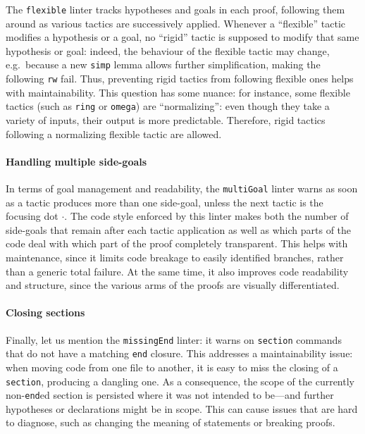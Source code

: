 \documentclass[runningheads]{llncs}
\newcommand{\lean}[1]{\texttt{#1}}
\newcommand{\hide}[1]{}
\begin{document}
The \lean{flexible} linter tracks hypotheses and goals in each proof, following them around as various tactics are successively applied.
Whenever a ``flexible'' tactic modifies a hypothesis or a goal, no ``rigid'' tactic is supposed to modify that same hypothesis or goal:
indeed, the behaviour of the flexible tactic may change, e.g.\ because a new \lean{simp} lemma allows further simplification, making the following \lean{rw} fail.
Thus, preventing rigid tactics from following flexible ones helps with maintainability.
%
This question has some nuance: for instance, some flexible tactics (such as \lean{ring} or \lean{omega}) are ``normalizing'': even though they take a variety of inputs, their output is more predictable. Therefore, rigid tactics following a normalizing flexible tactic are allowed.

\paragraph{Handling multiple side-goals} In terms of goal management and readability, the \lean{multiGoal} linter warns as soon as
a tactic produces more than one side-goal, unless the next tactic is the focusing dot $\cdot$. %
The code style enforced by this linter makes both the number of side-goals that remain after each tactic application as well as which parts of the code deal with which part of the proof completely transparent.
This helps with maintenance, since it limits code breakage to easily identified branches, rather than a generic total failure.
At the same time, it also improves code readability and structure, since the various arms of the proofs are visually differentiated.

\hide{The \lean{minImports} linter is another tool that helps code maintenance.
This linter inspects each declaration and, whenever a new declaration depends on more imported modules than the declaration preceding it, the linter emits a warning with a quantitative measure of the import increase.

This helps identify how to split files, based on their dependencies, providing a natural coalescence metric in terms of common prerequisites.
A similar tool is provided by the \lean{upstreamableDecl} linter, acting on a more granular level, giving information about individual declarations all of whose prerequisites are in an earlier file.}

\paragraph{Closing sections} Finally, let us mention the \lean{missingEnd} linter: it warns on \lean{section} commands that do not have a matching \lean{end} closure.
This addresses a maintainability issue: when moving code from one file to another, it is easy to miss the closing of a \lean{section}, producing a dangling one.
As a consequence, the scope of the currently non-\lean{end}ed section is persisted where it was not intended to be---and further hypotheses or declarations might be in scope. This can cause issues that are hard to diagnose, such as changing the meaning of statements or breaking proofs.
\end{document}
